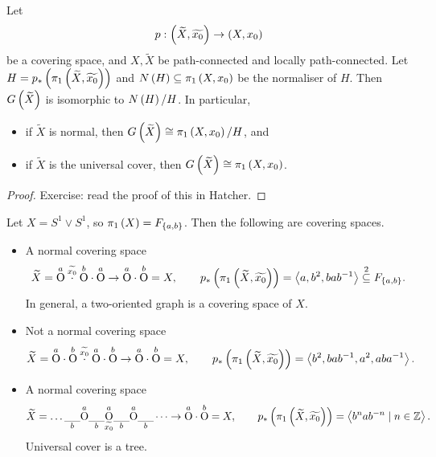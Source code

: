 \begin{proposition}
Let
$$ p : \left( \widetilde{X}, \widetilde{x_0} \right) \to \left( X, x_0 \right) $$
be a covering space, and $ X, \widetilde{X} $ be path-connected and locally path-connected. Let $ H = p_*\left( \pi_1\left( \widetilde{X}, \widetilde{x_0} \right) \right) $ and $ N\left( H \right) \subseteq \pi_1\left( X, x_0 \right) $ be the normaliser of $ H $. Then $ G\left( \widetilde{X} \right) $ is isomorphic to $ N\left( H \right) / H $. In particular,
\begin{itemize}
\item if $ \widetilde{X} $ is normal, then $ G\left( \widetilde{X} \right) \cong \pi_1\left( X, x_0 \right) / H $, and
\item if $ \widetilde{X} $ is the universal cover, then $ G\left( \widetilde{X} \right) \cong \pi_1\left( X, x_0 \right) $.
\end{itemize}
\end{proposition}

\begin{proof}
Exercise: read the proof of this in Hatcher.
\end{proof}

\begin{example*}
Let $ X = S^1 \vee S^1 $, so $ \pi_1\left( X \right) = F_{\left\{ a, b \right\}} $. Then the following are covering spaces.
\begin{itemize}
\item A normal covering space
$$ \widetilde{X} = \overset{a}{\text{O}} \overset{\widetilde{x_0}}{\cdot} \overset{b}{\text{O}} \cdot \overset{a}{\text{O}} \to \overset{a}{\text{O}} \cdot \overset{b}{\text{O}} = X, \qquad p_*\left( \pi_1\left( \widetilde{X}, \widetilde{x_0} \right) \right) = \left\langle a, b^2, bab^{-1} \right\rangle \overset{2}{\subseteq} F_{\left\{ a, b \right\}}. $$
In general, a two-oriented graph is a covering space of $ X $.
\item Not a normal covering space
$$ \widetilde{X} = \overset{a}{\text{O}} \cdot \overset{b}{\text{O}} \overset{\widetilde{x_0}}{\cdot} \overset{a}{\text{O}} \cdot \overset{b}{\text{O}} \to \overset{a}{\text{O}} \cdot \overset{b}{\text{O}} = X, \qquad p_*\left( \pi_1\left( \widetilde{X}, \widetilde{x_0} \right) \right) = \left\langle b^2, bab^{-1}, a^2, aba^{-1} \right\rangle. $$
\item A normal covering space
$$ \widetilde{X} = \dots \underset{b}{\_\_} \overset{a}{\text{O}} \underset{b}{\_\_} \underset{\widetilde{x_0}}{\overset{a}{\text{O}}} \underset{b}{\_\_} \overset{a}{\text{O}} \underset{b}{\_\_} \dots \to \overset{a}{\text{O}} \cdot \overset{b}{\text{O}} = X, \qquad p_*\left( \pi_1\left( \widetilde{X}, \widetilde{x_0} \right) \right) = \left\langle b^nab^{-n} \mid n \in \mathbb{Z} \right\rangle. $$
Universal cover is a tree.
\end{itemize}
\end{example*}

